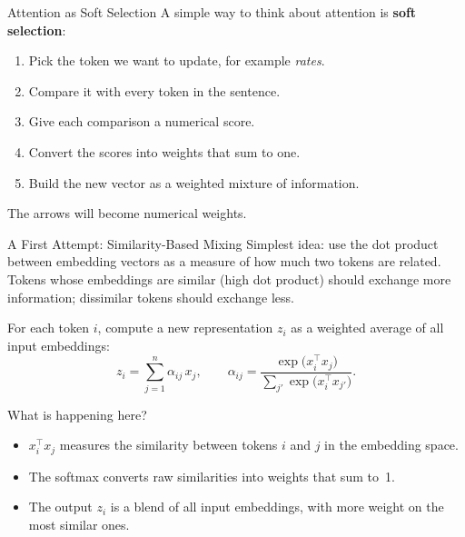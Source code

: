\documentclass[aspectratio=169]{beamer}
\begin{document}
\begin{frame}{Attention as Soft Selection}
  A simple way to think about attention is \textbf{soft selection}:
  \begin{enumerate}
    \item Pick the token we want to update, for example \textit{rates}.
    \item Compare it with every token in the sentence.
    \item Give each comparison a numerical score.
    \item Convert the scores into weights that sum to one.
    \item Build the new vector as a weighted mixture of information.
  \end{enumerate}

  \vspace{0.3em}
  \begin{center}
  \end{center}

  The arrows will become numerical weights.
\end{frame}
%
%
\begin{frame}{A First Attempt: Similarity-Based Mixing}
  Simplest idea: use the dot product between embedding vectors as a measure of how
  much two tokens are related.  Tokens whose embeddings are similar (high dot product)
  should exchange more information; dissimilar tokens should exchange less.

  For each token $i$, compute a new representation $z_i$ as a weighted average of all
  input embeddings:
  \[
    z_i = \sum_{j=1}^{n}\alpha_{ij}\,x_j, \qquad
    \alpha_{ij} = \frac{\exp\!\bigl(x_i^\top x_j\bigr)}
                       {\displaystyle\sum_{j'}\exp\!\bigl(x_i^\top x_{j'}\bigr)}.
  \]

  \begin{block}{What is happening here?}
    \begin{itemize}
      \item $x_i^\top x_j$ measures the similarity between tokens $i$ and $j$ in the
            embedding space.
      \item The softmax converts raw similarities into weights that sum to~1.
      \item The output $z_i$ is a blend of all input embeddings, with more weight on
            the most similar ones.
    \end{itemize}
  \end{block}
\end{frame}
\end{document}

